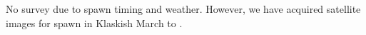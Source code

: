 No survey due to spawn timing and weather.
However, we have acquired satellite images
for spawn in Klaskish March  to .
